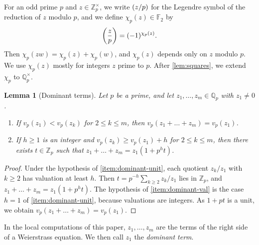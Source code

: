 \documentclass[12pt,oneside,openany]{book}
\theoremstyle{definition}
\theoremstyle{plain}
\numberwithin{equation}{chapter}
\theoremstyle{plain}
\newtheorem{lemma}[lemma]{Lemma}
\theoremstyle{definition}
\theoremstyle{remark}
\newcommand{\Q}{\mathbb Q}
\newcommand{\Z}{\mathbb Z}
\newcommand{\F}{\mathbb F}
\newcommand{\leg}[2]{\mathchoice{\left(\frac{#1}{#2}\right)}{(#1/#2)}{(#1/#2)}{(#1/#2)}}
\begin{document}
For an odd prime $p$ and $z\in\Z_p^\times$, we write $\leg zp$ for the Legendre symbol of the reduction of $z$ modulo $p$, and we define $\chi_p(z)\in\F_2$ by
\begin{equation}\label{eq:chi-def}
\leg zp=(-1)^{\chi_p(z)}.
\end{equation}
Then $\chi_p(zw)=\chi_p(z)+\chi_p(w)$, and $\chi_p(z)$ depends only on $z$ modulo $p$. We use $\chi_p(z)$ mostly for integers $z$ prime to $p$. After \cref{lem:squares}, we extend $\chi_p$ to $\Q_p^\times$.

\begin{lemma}[Dominant terms]\label{lem:dominant}
Let $p$ be a prime, and let $z_1,\dots,z_m\in\Q_p$ with $z_1\ne0$.
\begin{enumerate}[label=(\alph*),ref=(\alph*)]
\item\label{item:dominant-val} If $v_p(z_1)<v_p(z_k)$ for $2\le k\le m$, then $v_p(z_1+\dots+z_m)=v_p(z_1)$.
\item\label{item:dominant-unit} If $h\ge1$ is an integer and $v_p(z_k)\ge v_p(z_1)+h$ for $2\le k\le m$, then there exists $t\in\Z_p$ such that $z_1+\dots+z_m=z_1(1+p^ht)$.
\end{enumerate}
\end{lemma}

\begin{proof}
Under the hypothesis of \ref{item:dominant-unit}, each quotient $z_k/z_1$ with $k\ge2$ has valuation at least $h$. Then $t=p^{-h}\sum_{k\ge2}z_k/z_1$ lies in $\Z_p$, and $z_1+\dots+z_m=z_1(1+p^ht)$. The hypothesis of \ref{item:dominant-val} is the case $h=1$ of \ref{item:dominant-unit}, because valuations are integers. As $1+pt$ is a unit, we obtain $v_p(z_1+\dots+z_m)=v_p(z_1)$.
\end{proof}

In the local computations of this paper, $z_1,\dots,z_m$ are the terms of the right side of a Weierstrass equation. We then call $z_1$ the \emph{dominant term}.
\end{document}
